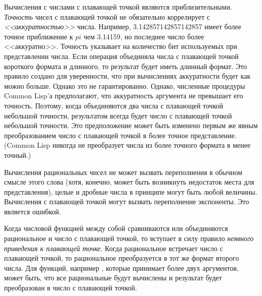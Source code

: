 Вычисления с числами с плавающей точкой являются приблизительными.
\emph{Точность} чисел с плавающей точкой не обязательно коррелирует с
\emph{<<аккуратностью>>} числа.
Например, 3.142857142857142857 имеет более точное приближение к $pi$ чем
3.14159, но последнее число более <<аккуратно>>.
Точность указывает на количество бит используемых при представлении числа.
Если операция объединяла числа с плавающей точкой короткого формата и длинного,
то результат будет иметь длинный формат. Это правило создано для уверенности,
что при вычислениях аккуратности будет как можно больше. Однако это не
гарантированно.
Однако, численные процедуры Common Lisp'а предполагают, что аккуратность
аргумента не превышает его точность. Поэтому, когда объединяются два 
числа с плавающей точкой небольшой точности, результатом всегда будет число с
плавающей точкой небольшой точности.
Это предположение может быть изменено первым же явным преобразованием
число с плавающей точкой в более точное представление.
(Common Lisp никогда не преобразует числа из более точного формата в менее точный.)

Вычисления рациональных чисел не может вызвать переполнения в обычном смысле
этого слова (хотя, конечно, может быть возникнуть недостаток места для
представления), целые и дробные числа в принципе могут быть любой величины.
Вычисления с плавающей точкой могут вызвать переполнение экспоненты. Это
является ошибкой.

Когда числовой функцией между собой сравниваются или объединяются рациональное и
число с плавающей точкой, то вступает в силу правило \emph{неявного приведения к
 плавающей точке}.
Когда рациональное встречает число с плавающей точкой, то рациональное
преобразуется в тот же формат второго числа.
Для функций, например \cdf{+}, которые принимает более двух аргументов, может
быть, что все рациональные будут вычислены и результат будет преобразован в
число с плавающей точкой.

